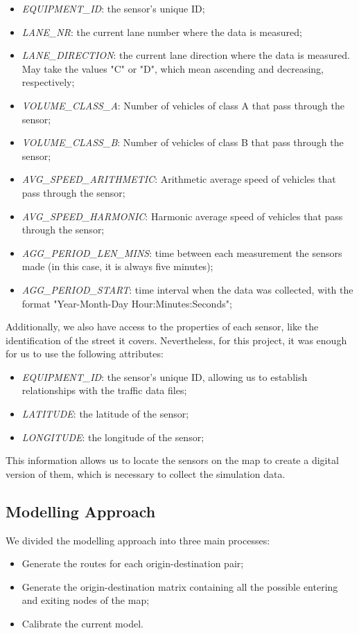 \documentclass[conference]{IEEEtran}
\begin{document}
\begin{itemize}
    \item \textit{EQUIPMENT\_ID}: the sensor's unique ID;
    \item \textit{LANE\_NR}: the current lane number where the data is measured;
    \item \textit{LANE\_DIRECTION}: the current lane direction where the data is measured. May take the values "C" or "D", which mean ascending and decreasing, respectively;
    \item \textit{VOLUME\_CLASS\_A}: Number of vehicles of class A that pass through the sensor;
    \item \textit{VOLUME\_CLASS\_B}: Number of vehicles of class B that pass through the sensor;
    \item \textit{AVG\_SPEED\_ARITHMETIC}: Arithmetic average speed of vehicles that pass through the sensor;
    \item \textit{AVG\_SPEED\_HARMONIC}: Harmonic average speed of vehicles that pass through the sensor;
    \item \textit{AGG\_PERIOD\_LEN\_MINS}: time between each measurement the sensors made (in this case, it is always five minutes);
    \item \textit{AGG\_PERIOD\_START}: time interval when the data was collected, with the format "Year-Month-Day Hour:Minutes:Seconds";
\end{itemize}

Additionally, we also have access to the properties of each sensor, like the identification of the street it covers. Nevertheless, for this project, it was enough for us to use the following attributes:

\begin{itemize}
    \item \textit{EQUIPMENT\_ID}: the sensor's unique ID, allowing us to establish relationships with the traffic data files;
    \item \textit{LATITUDE}: the latitude of the sensor;
    \item \textit{LONGITUDE}: the longitude of the sensor;
\end{itemize}

This information allows us to locate the sensors on the map to create a digital version of them, which is necessary to collect the simulation data.

\subsection{Modelling Approach}
\label{modelling-approach}
We divided the modelling approach into three main processes:
\begin{itemize}
    \item Generate the routes for each origin-destination pair;  
    \item Generate the origin-destination matrix containing all the possible entering and exiting nodes of the map; 
    \item Calibrate the current model. 
\end{itemize}
\end{document}
